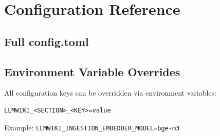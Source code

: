 ﻿%
\chapter{Configuration Reference}
\label{app:config-reference}

\section{Full config.toml}


\section{Environment Variable Overrides}
All configuration keys can be overridden via environment variables:
\begin{verbatim}
LLMWIKI_<SECTION>_<KEY>=value
\end{verbatim}
Example: \texttt{LLMWIKI\_INGESTION\_EMBEDDER\_MODEL=bge-m3}

